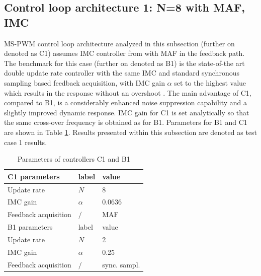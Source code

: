 \documentclass[journal]{IEEEtran}
\begin{document}
\subsection{Control loop architecture 1: N=8 with MAF, IMC}
MS-PWM control loop architecture analyzed in this subsection (further on denoted as C1) assumes IMC controller from \cite{vuksa2016} with MAF in the feedback path. The benchmark for this case (further on denoted as B1) is the state-of-the art double update rate controller with the same IMC and standard synchronous sampling based feedback acquisition, with IMC gain $\alpha$ set to the highest value which results in the response without an overshoot \cite{vuksa2016}. The main advantage of C1, compared to B1, is a considerably enhanced noise suppression capability and a slightly improved dynamic response. IMC gain for C1 is set analytically so that the same cross-over frequency is obtained as for B1. Parameters for B1 and C1 are shown in Table \ref{tab: case 1}. Results presented within this subsection are denoted as test case 1 results. \par


\begin{table}[h!]
			  \caption{Parameters of controllers C1 and B1}
              \label{tab: case 1}
              \centering
              \begin{tabular}{lll}
                           \midrule\midrule
        C1 parameters     & label           & value\\
        \midrule               
                  Update rate   	& $N$      & 8\\  
                  IMC gain    & $\alpha$      & 0.0636    \\
                  Feedback acquisition    & $/$      & MAF\\
                  \midrule\midrule
        B1 parameters & label           & value\\
                  \midrule
                  Update rate   	& $N$      & 2\\  
                  IMC gain    & $\alpha$      & 0.25    \\
                  Feedback acquisition    & $/$      & sync. sampl.\\                                                         
                  \midrule\midrule
              \end{tabular}
\end{table}
\end{document}
